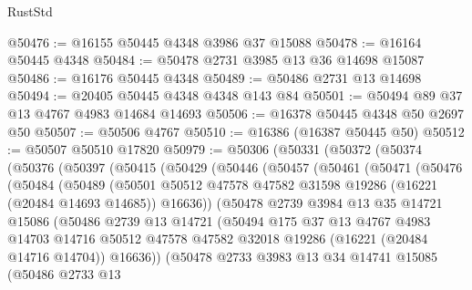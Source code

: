 \begin{lexlean}{RustStd}
\begin{coremodule}
@50476 := @16155 @50445 @4348 @3986 @37 @15088
@50478 := @16164 @50445 @4348
@50484 := @50478 @2731 @3985 @13 @36 @14698 @15087
@50486 := @16176 @50445 @4348
@50489 := @50486 @2731 @13 @14698
@50494 := @20405 @50445 @4348 @4348 @143 @84
@50501 := @50494 @89 @37 @13 @4767 @4983 @14684 @14693
@50506 := @16378 @50445 @4348 @50 @2697 @50
@50507 := @50506 @4767
@50510 := @16386 (@16387 @50445 @50)
@50512 := @50507 @50510 @17820
@50979 := @50306
    (@50331
      (@50372
        (@50374
          (@50376
            (@50397
              (@50415
                (@50429
                  (@50446
                    (@50457
                      (@50461
                        (@50471
                          (@50476
                            (@50484
                              (@50489
                                (@50501
                                  @50512
                                  @47578
                                  @47582
                                  @31598
                                  @19286
                                  (@16221 (@20484 @14693 @14685))
                                  @16636))
                              (@50478
                                @2739
                                @3984
                                @13
                                @35
                                @14721
                                @15086
                                (@50486
                                  @2739
                                  @13
                                  @14721
                                  (@50494
                                    @175
                                    @37
                                    @13
                                    @4767
                                    @4983
                                    @14703
                                    @14716
                                    @50512
                                    @47578
                                    @47582
                                    @32018
                                    @19286
                                    (@16221 (@20484 @14716 @14704))
                                    @16636))
                                (@50478
                                  @2733
                                  @3983
                                  @13
                                  @34
                                  @14741
                                  @15085
                                  (@50486
                                    @2733
                                    @13

\end{coremodule}
\end{lexlean}
